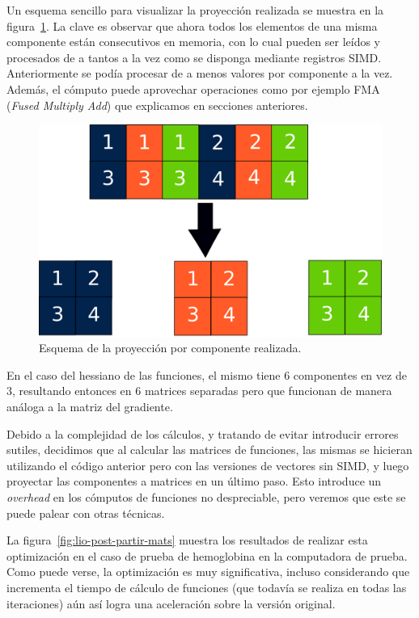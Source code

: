 Un esquema sencillo para visualizar la proyecci\'on realizada se muestra en
la figura~\ref{fig:matrix-split-img}. La clave es observar que ahora todos los
elementos de una misma componente est\'an consecutivos en memoria, con lo cual
pueden ser le\'idos y procesados de a tantos a la vez como se disponga mediante
registros SIMD. Anteriormente se pod\'ia procesar de a menos valores por
componente a la vez. Adem\'as, el c\'omputo puede aprovechar operaciones como
por ejemplo FMA (\textit{Fused Multiply Add}) que explicamos en secciones
anteriores.

\begin{figure}[htbp]
   \centering
   \includegraphics[width=\plotwidth]{images/matrix-split-img.png}
   \caption{Esquema de la proyecci\'on por componente realizada.}
   \label{fig:matrix-split-img}
\end{figure}

En el caso del hessiano de las funciones, el mismo tiene 6 componentes en vez
de 3, resultando entonces en 6 matrices separadas pero que funcionan de manera
an\'aloga a la matriz del gradiente.

Debido a la complejidad de los c\'alculos, y tratando de evitar introducir
errores sutiles, decidimos que al calcular las matrices de funciones, las
mismas se hicieran utilizando el c\'odigo  anterior pero con las versiones de
vectores sin SIMD, y luego proyectar las componentes a matrices en un \'ultimo
paso. Esto introduce un \textit{overhead} en los c\'omputos de funciones no
despreciable, pero veremos que este se puede palear con otras t\'ecnicas.

La figura~\ref{fig:lio-post-partir-mats} muestra los resultados de realizar esta
optimizaci\'on en el caso de prueba de hemoglobina en la computadora de prueba.
Como puede verse, la optimizaci\'on es muy significativa, incluso considerando
que incrementa el tiempo de c\'alculo de funciones (que todav\'ia se realiza en
todas las iteraciones) a\'un as\'i logra una aceleraci\'on sobre la versi\'on
original.

